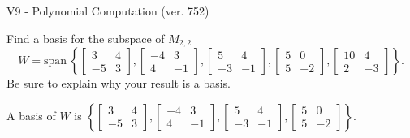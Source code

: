 \begin{exercise}
  \begin{exerciseTitle}V9 - Polynomial Computation (ver. 752)\end{exerciseTitle}
  \begin{exerciseStatement}
    Find a basis for the subspace of \(M_{2,2}\) 
\[W=\mathrm{span}\ \left\{\left[\begin{array}{cc}
3 & 4 \\
-5 & 3
\end{array}\right] , \left[\begin{array}{cc}
-4 & 3 \\
4 & -1
\end{array}\right] , \left[\begin{array}{cc}
5 & 4 \\
-3 & -1
\end{array}\right] , \left[\begin{array}{cc}
5 & 0 \\
5 & -2
\end{array}\right] , \left[\begin{array}{cc}
10 & 4 \\
2 & -3
\end{array}\right]\right\}.\]
 Be sure to explain why your result is a basis.


  \end{exerciseStatement}
  \begin{exerciseAnswer}
   A basis of \(W\) is  \(\left\{\left[\begin{array}{cc}
3 & 4 \\
-5 & 3
\end{array}\right] , \left[\begin{array}{cc}
-4 & 3 \\
4 & -1
\end{array}\right] , \left[\begin{array}{cc}
5 & 4 \\
-3 & -1
\end{array}\right] , \left[\begin{array}{cc}
5 & 0 \\
5 & -2
\end{array}\right]\right\}\).
  


  \end{exerciseAnswer}
\end{exercise}